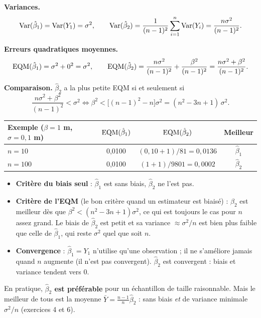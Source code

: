 \documentclass[11pt,a4paper]{article}
\newcommand{\sumi}{\sum_{i=1}^{n}}
\begin{document}
\textbf{Variances.}
\[
\Var(\hat\beta_1)=\Var(Y_1)=\sigma^2,
\qquad
\Var(\hat\beta_2)=\frac{1}{(n-1)^2}\sumi\Var(Y_i)=\frac{n\sigma^2}{(n-1)^2}.
\]

\textbf{Erreurs quadratiques moyennes.}
\[
\operatorname{EQM}(\hat\beta_1)=\sigma^2+0^2=\sigma^2,
\qquad
\operatorname{EQM}(\hat\beta_2)=\frac{n\sigma^2}{(n-1)^2}+\frac{\beta^2}{(n-1)^2}=\frac{n\sigma^2+\beta^2}{(n-1)^2}.
\]

\textbf{Comparaison.} $\hat\beta_2$ a la plus petite EQM si et seulement si
\[
\frac{n\sigma^2+\beta^2}{(n-1)^2}<\sigma^2\iff \beta^2<\big[(n-1)^2-n\big]\sigma^2=(n^2-3n+1)\,\sigma^2 .
\]

\begin{center}
\renewcommand{\arraystretch}{1.3}
\begin{tabular}{@{}lccc@{}}
\toprule
Exemple ($\beta=1$ m, $\sigma=0{,}1$ m) & $\operatorname{EQM}(\hat\beta_1)$ & $\operatorname{EQM}(\hat\beta_2)$ & Meilleur \\
\midrule
$n=10$ & 0,0100 & $(0{,}10+1)/81=0{,}0136$ & $\hat\beta_1$ \\
$n=100$ & 0,0100 & $(1+1)/9801=0{,}0002$ & $\hat\beta_2$ \\
\bottomrule
\end{tabular}
\end{center}

\begin{reponse}
\begin{itemize}
\item \textbf{Critère du biais seul} : $\hat\beta_1$ est sans biais, $\hat\beta_2$ ne l'est pas.
\item \textbf{Critère de l'EQM} (le bon critère quand un estimateur est biaisé) : $\hat\beta_2$ est meilleur dès que $\beta^2<(n^2-3n+1)\sigma^2$, ce qui est toujours le cas pour $n$ assez grand. Le biais de $\hat\beta_2$ est petit et sa variance $\approx\sigma^2/n$ est bien plus faible que celle de $\hat\beta_1$, qui reste $\sigma^2$ quel que soit $n$.
\item \textbf{Convergence} : $\hat\beta_1=Y_1$ n'utilise qu'une observation ; il ne s'améliore jamais quand $n$ augmente (il n'est pas convergent). $\hat\beta_2$ est convergent : biais et variance tendent vers 0.
\end{itemize}
En pratique, \textbf{$\hat\beta_2$ est préférable} pour un échantillon de taille raisonnable. Mais le meilleur de tous est la moyenne $\bar Y=\frac{n-1}{n}\hat\beta_2$ : sans biais \emph{et} de variance minimale $\sigma^2/n$ (exercices 4 et 6).
\end{reponse}
\end{document}
